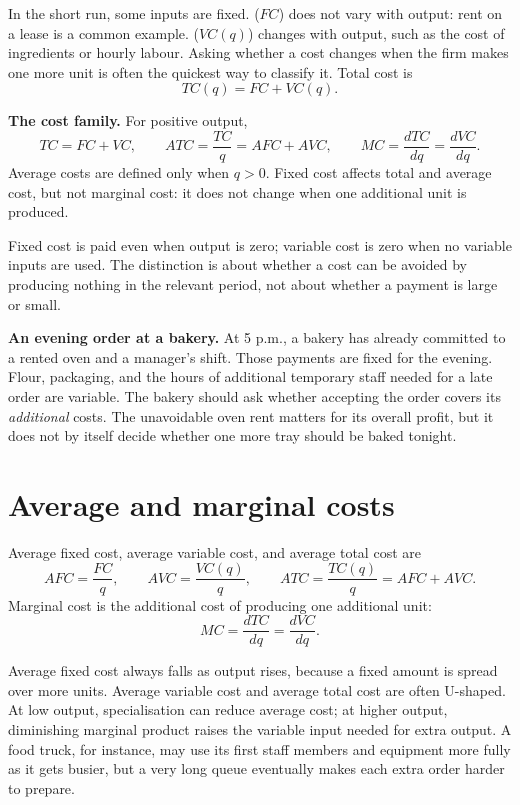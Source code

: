 In the short run, some inputs are fixed.  ($FC$) does not
vary with output: rent on a lease is a common example.  ($VC(q)$) changes with output, such as the cost of ingredients or
hourly labour. Asking whether a cost changes when the firm makes one more
unit is often the quickest way to classify it. Total cost is
\[
TC(q)=FC+VC(q).
\]

\begin{keyidea}
\textbf{The cost family.} For positive output,
\[
TC=FC+VC,\qquad
ATC=\frac{TC}{q}=AFC+AVC,\qquad
MC=\frac{dTC}{dq}=\frac{dVC}{dq}.
\]
Average costs are defined only when $q>0$. Fixed cost affects total and
average cost, but not marginal cost: it does not change when one additional
unit is produced.
\end{keyidea}

Fixed cost is paid even when output is zero; variable cost is zero when no
variable inputs are used. The distinction is about whether a cost can be
avoided by producing nothing in the relevant period, not about whether a
payment is large or small.

\begin{exercisebox}
\textbf{An evening order at a bakery.}
At 5 p.m., a bakery has already committed to a rented oven and a manager's
shift. Those payments are fixed for the evening. Flour, packaging, and the
hours of additional temporary staff needed for a late order are variable.
The bakery should ask whether accepting the order covers its \emph{additional}
costs. The unavoidable oven rent matters for its overall profit, but it does
not by itself decide whether one more tray should be baked tonight.
\end{exercisebox}

\section{Average and marginal costs}

Average fixed cost, average variable cost, and average total cost are
\[
AFC=\frac{FC}{q}, \qquad
AVC=\frac{VC(q)}{q}, \qquad
ATC=\frac{TC(q)}{q}=AFC+AVC.
\]
Marginal cost is the additional cost of producing one additional unit:
\[
MC=\frac{dTC}{dq}=\frac{dVC}{dq}.
\]

Average fixed cost always falls as output rises, because a fixed amount is
spread over more units. Average variable cost and average total cost are often
U-shaped. At low output, specialisation can reduce average cost; at higher
output, diminishing marginal product raises the variable input needed for
extra output. A food truck, for instance, may use its first staff members and
equipment more fully as it gets busier, but a very long queue eventually makes
each extra order harder to prepare.

